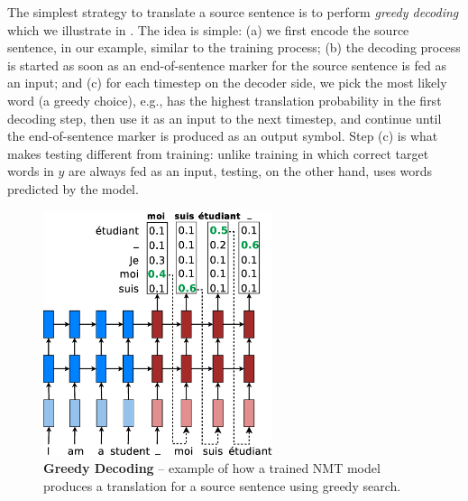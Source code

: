 The simplest strategy to translate a source sentence is to perform {\it greedy
decoding} which we illustrate in . The idea is simple: (a) we
first encode the source sentence,
 in our example, similar to the training process; (b) the
decoding process is started as soon as
an end-of-sentence marker \word{\_} for the source sentence is fed as an input; and (c) for each
timestep on the decoder side,
we pick the most likely word (a greedy choice), e.g.,  has the highest
translation probability in the first
decoding step, then use it as an input to the next timestep, and continue
until the end-of-sentence marker \word{\_} is produced as an output symbol. Step
(c) is what makes testing different from training: unlike training in which
correct target words in $y$ are always fed as an input, testing, on the other
hand, uses words predicted by the model.

\begin{figure}[tbh!]
\centering
\includegraphics[width=0.6\textwidth, clip=true, trim= 0 0 0
0]{img/nmt_test.eps} %
\caption[Greedy Decoding]{{\bf Greedy Decoding}
-- example of how a trained NMT model produces a translation for a
source sentence  using greedy search.
} 
\label{f:nmt_test}
\end{figure}

